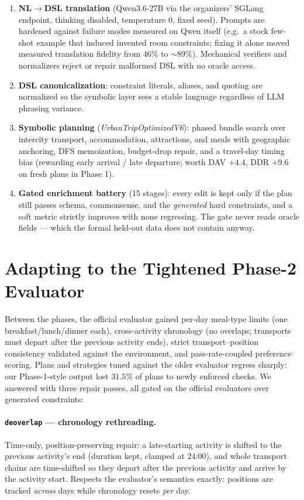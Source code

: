 \documentclass[11pt,a4paper]{article}
\begin{document}
\begin{enumerate}[leftmargin=1.4em,itemsep=1pt]
\item \textbf{NL$\to$DSL translation} (Qwen3.6-27B via the organizers'
SGLang endpoint, thinking disabled, temperature $0$, fixed seed). Prompts are
hardened against failure modes measured on Qwen itself (e.g.\ a stock few-shot
example that induced invented room constraints; fixing it alone moved measured
translation fidelity from $46\%$ to ${\sim}89\%$). Mechanical verifiers and
normalizers reject or repair malformed DSL with no oracle access.
\item \textbf{DSL canonicalization}: constraint literals, aliases, and quoting
are normalized so the symbolic layer sees a stable language regardless of LLM
phrasing variance.
\item \textbf{Symbolic planning} (\emph{UrbanTripOptimizedV6}): phased bundle
search over intercity transport, accommodation, attractions, and meals with
geographic anchoring, DFS memoization, budget-drop repair, and a travel-day
timing bias (rewarding early arrival / late departure; worth DAV $+4.4$,
DDR $+9.6$ on fresh plans in Phase 1).
\item \textbf{Gated enrichment battery} (15 stages): every edit is kept only
if the plan still passes schema, commonsense, and the \emph{generated} hard
constraints, and a soft metric strictly improves with none regressing. The
gate never reads oracle fields --- which the formal held-out data does not
contain anyway.
\end{enumerate}

\section{Adapting to the Tightened Phase-2 Evaluator}
\label{sec:adapt}

Between the phases, the official evaluator gained per-day meal-type limits
(one breakfast/lunch/dinner each), cross-activity chronology (no overlaps;
transports must depart after the previous activity ends), strict
transport--position consistency validated against the environment, and
pass-rate-coupled preference scoring. Plans and strategies tuned against the
older evaluator regress sharply: our Phase-1-style output lost $31.5\%$ of
plans to newly enforced checks. We answered with three repair passes, all
gated on the official evaluators over generated constraints:

\paragraph{\texttt{deoverlap} --- chronology rethreading.}
Time-only, position-preserving repair: a late-starting activity is shifted to
the previous activity's end (duration kept, clamped at 24:00), and whole
transport chains are time-shifted so they depart after the previous activity
and arrive by the activity start. Respects the evaluator's semantics exactly:
positions are tracked \emph{across} days while chronology resets \emph{per}
day.
\end{document}
